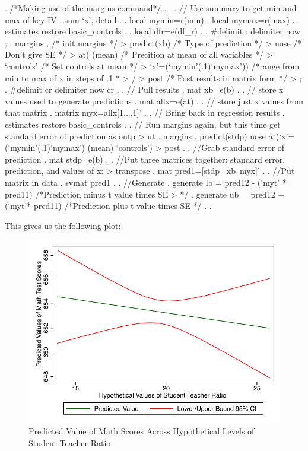 \documentclass[12pt]{article}
\begin{document}
\begin{stlog}
  
. /*Making use of the margins command*/
. 
. 
. // Use summary to get min and max of key IV    
. sum `x', detail
. 
. local mymin=r(min)
. local mymax=r(max)
. 
. estimates restore basic_controls
. 
. local dfr=e(df_r)
. 
. #delimit ;
delimiter now ;
. margins , /* init margins */
>     predict(xb) /* Type of prediction */
>     nose /* Don't give SE */
>     at( (mean) /* Precition at mean of all variables */
>     `controls' /* Set controls at mean */
>     `x'=(`mymin'(.1)`mymax'))  /*range from min to max of x in steps of .1 *
> /
>      post  /* Post results in matrix form */
>          ;
. #delimit cr
delimiter now cr
. 
. // Pull results
. mat xb=e(b)
. 
. // store x values used to generate predictions
. mat allx=e(at)
. 
. // store just x values from that matrix
. matrix myx=allx[1...,1]'
. 
. // Bring back in regression results
. estimates restore basic_controls
. 
. // Run margins again, but this time get standard error of prediction as outp
> ut
. margins , predict(stdp) nose at(`x'=(`mymin'(.1)`mymax') (mean) `controls') 
> post
. 
. //Grab standard error of prediction
. mat stdp=e(b)
. 
. //Put three matrices together: standard error, prediction, and values of x: 
> transpose 
. mat pred1=[stdp \ xb\ myx]'
. 
. //Put matrix in data 
. svmat pred1
. 
. //Generate
. generate lb = pred12 - (`myt' * pred11) /*Prediction minus t value times SE 
> */
. generate ub = pred12 + (`myt'* pred11) /*Prediction plus t value times SE */
. 
. 
\end{stlog}

This gives us the following plot:

\begin{figure}
  \centering
  \caption{Predicted Value of Math Scores Across Hypothetical Levels
    of Student Teacher Ratio}
\includegraphics{ci_predict95}
\end{figure}
\end{document}
